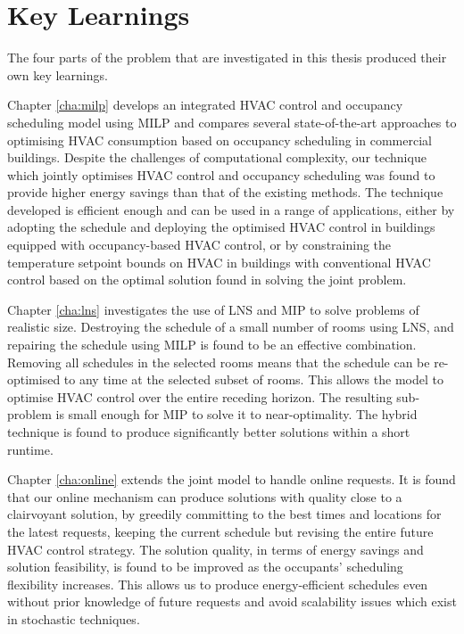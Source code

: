 \section{Key Learnings}

The four parts of the problem that are investigated in this thesis produced their own key learnings.

Chapter \ref{cha:milp} develops an integrated HVAC control and occupancy scheduling model using MILP and compares several state-of-the-art approaches to optimising HVAC consumption based on occupancy scheduling in commercial buildings. Despite the challenges of computational complexity, our technique which jointly optimises HVAC control and occupancy scheduling was found to provide higher energy savings than that of the existing methods. The technique developed is efficient enough and can be used in a range of applications, either by adopting the schedule and deploying the optimised HVAC control in buildings equipped with occupancy-based HVAC control, or by constraining the temperature setpoint bounds on HVAC in buildings with conventional HVAC control based on the optimal solution found in solving the joint problem.

Chapter \ref{cha:lns} investigates the use of LNS and MIP to solve problems of realistic size. Destroying the schedule of a small number of rooms using LNS, and repairing the schedule using MILP is found to be an effective combination. Removing all schedules in the selected rooms means that the schedule can be re-optimised to any time at the selected subset of rooms. This allows the model to optimise HVAC control over the entire receding horizon. The resulting sub-problem is small enough for MIP to solve it to near-optimality. The hybrid technique is found to produce significantly better solutions within a short runtime.

Chapter \ref{cha:online} extends the joint model to handle online requests. It is found that our online mechanism can produce solutions with quality close to a clairvoyant solution, by greedily committing to the best times and locations for the latest requests, keeping the current schedule but revising the entire future HVAC control strategy. The solution quality, in terms of energy savings and solution feasibility, is found to be improved as the occupants' scheduling flexibility increases. This allows us to produce energy-efficient schedules even without prior knowledge of future requests and avoid scalability issues which exist in stochastic techniques.

